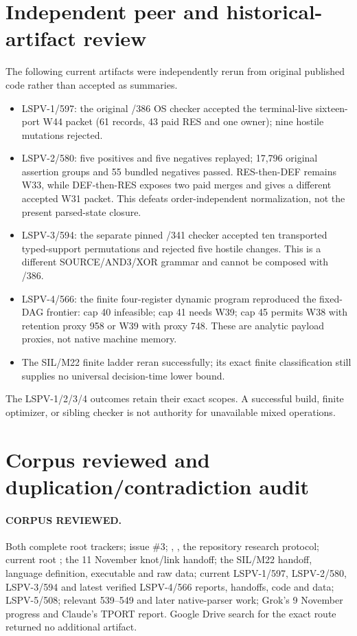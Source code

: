 \documentclass[11pt]{article}
\begin{document}
\section{Independent peer and historical-artifact review}
The following current artifacts were independently rerun from original
published code rather than accepted as summaries.
\begin{itemize}
\item LSPV-1/597: the original /386 OS checker accepted the terminal-live
  sixteen-port W44 packet (61 records, 43 paid RES and one owner); nine hostile
  mutations rejected.
\item LSPV-2/580: five positives and five negatives replayed; 17,796 original
  assertion groups and 55 bundled negatives passed.  RES-then-DEF remains W33,
  while DEF-then-RES exposes two paid merges and gives a different accepted
  W31 packet.  This defeats order-independent normalization, not the present
  parsed-state closure.
\item LSPV-3/594: the separate pinned /341 checker accepted ten transported
  typed-support permutations and rejected five hostile changes.  This is a
  different SOURCE/AND3/XOR grammar and cannot be composed with /386.
\item LSPV-4/566: the finite four-register dynamic program reproduced the
  fixed-DAG frontier: cap 40 infeasible; cap 41 needs W39; cap 45 permits W38
  with retention proxy 958 or W39 with proxy 748.  These are analytic payload
  proxies, not native machine memory.
\item The SIL/M22 finite ladder reran successfully; its exact finite
  classification still supplies no universal decision-time lower bound.
\end{itemize}
The LSPV-1/2/3/4 outcomes retain their exact scopes.  A successful build,
finite optimizer, or sibling checker is not authority for unavailable mixed
operations.

\section{Corpus reviewed and duplication/contradiction audit}
\paragraph{CORPUS REVIEWED.}
Both complete root trackers; issue \#3; , , the
repository research protocol; current root ; the 11 November
knot/link handoff; the SIL/M22 handoff, language definition, executable and raw
data; current LSPV-1/597, LSPV-2/580, LSPV-3/594 and latest verified
LSPV-4/566 reports, handoffs, code and data; LSPV-5/508; relevant 539--549 and
later native-parser work; Grok's 9 November progress and Claude's TPORT report.
Google Drive search for the exact route returned no additional artifact.
\end{document}
